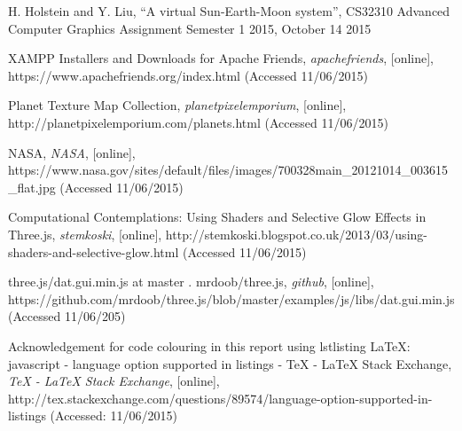 \documentclass[12pt]{article}
\begin{document}
\begin{thebibliography}{5}

 H. Holstein and Y. Liu, ``A virtual Sun-Earth-Moon system'', CS32310 Advanced Computer Graphics Assignment Semester 1 2015, October 14 2015

 XAMPP Installers and Downloads for Apache Friends, {\em apachefriends}, [online], 
https://www.apachefriends.org/index.html (Accessed 11/06/2015)

 Planet Texture Map Collection, {\em planetpixelemporium}, [online],
http://planetpixelemporium.com/planets.html (Accessed 11/06/2015)

 NASA, {\em NASA}, [online], 
https://www.nasa.gov/sites/default/files/images/700328main\_20121014\_003615\_flat.jpg (Accessed 11/06/2015)

 Computational Contemplations: Using Shaders and Selective Glow Effects in Three.js, {\em stemkoski}, [online],
http://stemkoski.blogspot.co.uk/2013/03/using-shaders-and-selective-glow.html (Accessed 11/06/2015)

 three.js/dat.gui.min.js at master . mrdoob/three.js, {\em github}, [online],
https://github.com/mrdoob/three.js/blob/master/examples/js/libs/dat.gui.min.js (Accessed 11/06/205)

  Acknowledgement for code colouring in this report using lstlisting LaTeX: 
javascript - language option supported in listings - TeX - LaTeX Stack Exchange, {\em TeX - LaTeX Stack Exchange}, [online],
http://tex.stackexchange.com/questions/89574/language-option-supported-in-listings (Accessed: 11/06/2015)

\end{thebibliography}
\end{document}
